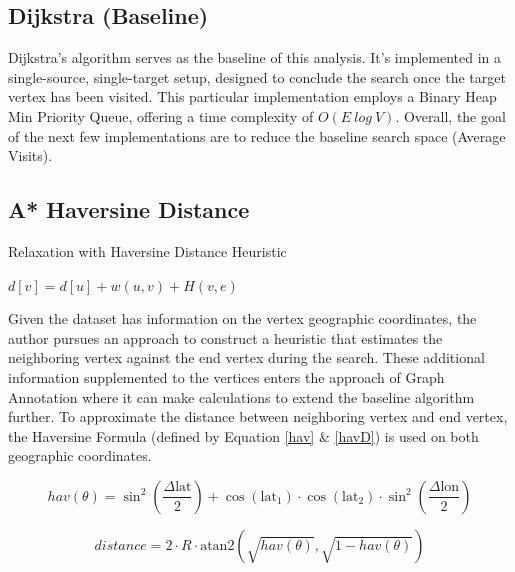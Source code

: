 \documentclass{article}
\begin{document}
\subsection{Dijkstra (Baseline)}

Dijkstra's algorithm serves as the baseline of this analysis. It's 
implemented in a single-source, single-target setup, designed to conclude 
the search once the target vertex has been visited. This particular 
implementation employs a Binary Heap Min Priority Queue, offering a time 
complexity of \(O(E \ log \ V)\). Overall, the goal of the next few 
implementations are to reduce the baseline search space (Average Visits).

\subsection{A* Haversine Distance}

\begin{algorithm}
\caption{Relaxation with Haversine Distance Heuristic}\label{alg:cap}
\begin{algorithmic}
    \State $d[v] = d[u] + w(u, v) + H(v, e)$ 
   \EndIf
\EndFunction
\end{algorithmic}
\label{algorithm:relaxH}
\end{algorithm}

Given the dataset has information on the vertex geographic coordinates,
the author pursues an approach to construct a heuristic that estimates the
neighboring vertex against the end vertex during the search. These additional information supplemented to the vertices enters the approach of Graph Annotation where it can make calculations to extend the baseline algorithm further. To approximate the distance between neighboring vertex and end vertex, the Haversine Formula (defined by Equation \ref{hav} \& \ref{havD}) is used on both geographic coordinates. 

\begin{equation}
    hav(\theta) = \sin^2\left(\frac{\Delta\text{lat}}{2}\right) + \cos(\text{lat}_1) \cdot \cos(\text{lat}_2) \cdot \sin^2\left(\frac{\Delta\text{lon}}{2}\right)
\label{hav}
\end{equation}

\begin{equation}
    distance = 2 \cdot R \cdot \text{atan2}\left(\sqrt{hav(\theta)}, \sqrt{1 - hav(\theta)}\right)
\label{havD}
\end{equation}
\end{document}

